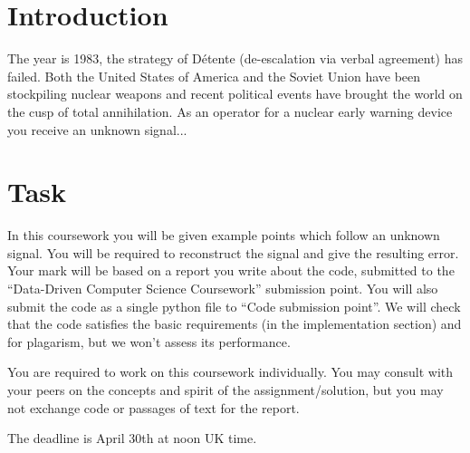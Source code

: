 \documentclass[10pt]{article}
\date{}
\author{Originally by: Michael Wray \& Davide Moltisanti}
\begin{document}
\maketitle

\section{Introduction}
\label{sec:intro}
The year is 1983, the strategy of D\'etente (de-escalation via verbal agreement) has failed.
Both the United States of America and the Soviet Union have been stockpiling nuclear weapons and recent political events have brought the world on the cusp of total annihilation.
As an operator for a nuclear early warning device you receive an unknown signal... 

\section{Task}
\label{sec:task}
In this coursework you will be given example points which follow an unknown signal.
You will be required to reconstruct the signal and give the resulting error.
Your mark will be based on a report you write about the code, submitted to the ``Data-Driven Computer Science Coursework'' submission point.
You will also submit the code as a single python file to ``Code submission point''.  
We will check that the code satisfies the basic requirements (in the implementation section) and for plagarism, but we won't assess its performance.

You are required to work on this coursework individually. You may consult with your peers on the concepts and spirit of the assignment/solution, but you may not exchange code or passages of text for the report.

The deadline is April 30th at noon UK time.
\end{document}
